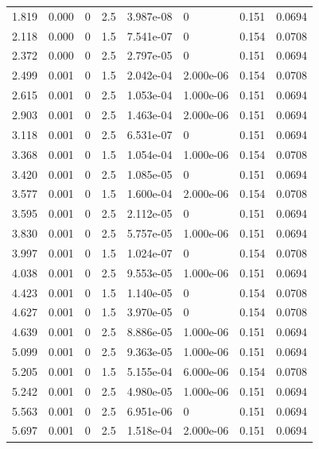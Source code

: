 \documentclass[preview]{standalone}
\begin{document}
{{\begin{tabular}{L{1.2cm}C{1.2cm} C{0.3cm}C{0.5cm} C{1.4cm}C{1.4cm} C{1.4cm}C{1.4cm}}
  1.819  &  0.000  & 0     & 2.5 &  3.987e-08  & 0  & 0.151 &  0.0694   \\ 
  2.118  &  0.000  & 0     & 1.5 &  7.541e-07  & 0  & 0.154 &  0.0708   \\ 
  2.372  &  0.000  & 0     & 2.5 &  2.797e-05  & 0  & 0.151 &  0.0694   \\ 
  2.499  &  0.001  & 0     & 1.5 &  2.042e-04  & 2.000e-06  & 0.154 &  0.0708   \\ 
  2.615  &  0.001  & 0     & 2.5 &  1.053e-04  & 1.000e-06  & 0.151 &  0.0694   \\ 
  2.903  &  0.001  & 0     & 2.5 &  1.463e-04  & 2.000e-06  & 0.151 &  0.0694   \\ 
  3.118  &  0.001  & 0     & 2.5 &  6.531e-07  & 0  & 0.151 &  0.0694   \\ 
  3.368  &  0.001  & 0     & 1.5 &  1.054e-04  & 1.000e-06  & 0.154 &  0.0708   \\ 
  3.420  &  0.001  & 0     & 2.5 &  1.085e-05  & 0  & 0.151 &  0.0694   \\ 
  3.577  &  0.001  & 0     & 1.5 &  1.600e-04  & 2.000e-06  & 0.154 &  0.0708   \\ 
  3.595  &  0.001  & 0     & 2.5 &  2.112e-05  & 0  & 0.151 &  0.0694   \\ 
  3.830  &  0.001  & 0     & 2.5 &  5.757e-05  & 1.000e-06  & 0.151 &  0.0694   \\ 
  3.997  &  0.001  & 0     & 1.5 &  1.024e-07  & 0  & 0.154 &  0.0708   \\ 
  4.038  &  0.001  & 0     & 2.5 &  9.553e-05  & 1.000e-06  & 0.151 &  0.0694   \\ 
  4.423  &  0.001  & 0     & 1.5 &  1.140e-05  & 0  & 0.154 &  0.0708   \\ 
  4.627  &  0.001  & 0     & 1.5 &  3.970e-05  & 0  & 0.154 &  0.0708   \\ 
  4.639  &  0.001  & 0     & 2.5 &  8.886e-05  & 1.000e-06  & 0.151 &  0.0694   \\ 
  5.099  &  0.001  & 0     & 2.5 &  9.363e-05  & 1.000e-06  & 0.151 &  0.0694   \\ 
  5.205  &  0.001  & 0     & 1.5 &  5.155e-04  & 6.000e-06  & 0.154 &  0.0708   \\ 
  5.242  &  0.001  & 0     & 2.5 &  4.980e-05  & 1.000e-06  & 0.151 &  0.0694   \\ 
  5.563  &  0.001  & 0     & 2.5 &  6.951e-06  & 0  & 0.151 &  0.0694   \\ 
  5.697  &  0.001  & 0     & 2.5 &  1.518e-04  & 2.000e-06  & 0.151 &  0.0694   \\ 

\end{tabular}}}
\end{document}
